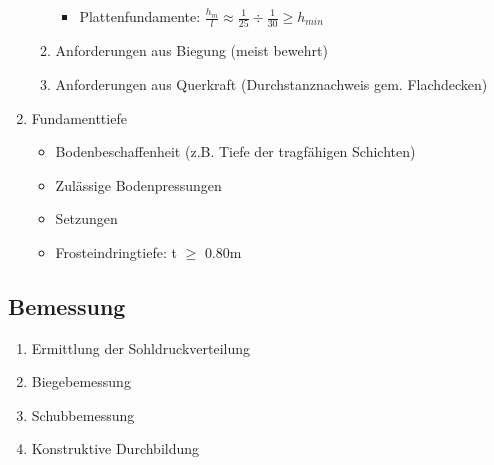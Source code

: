 \begin{multicols}{2}
\begin{enumerate}
\begin{enumerate}
\begin{itemize}
								\item Plattenfundamente: $ \frac{h_m}{l} \approx \frac{1}{25} \div \frac{1}{30} \geq h_{min}  $
								
							\end{itemize}
					
						\item Anforderungen aus Biegung (meist bewehrt)
					
						\item Anforderungen aus Querkraft (Durchstanznachweis gem. Flachdecken)
					
					\end{enumerate}
			
				\item Fundamenttiefe
					\begin{itemize}
						
						\item Bodenbeschaffenheit (z.B. Tiefe der tragfähigen Schichten)
						\item Zulässige Bodenpressungen
						\item Setzungen
						\item Frosteindringtiefe: t $\geq$ 0.80m
						
						
					\end{itemize}
				
			\end{enumerate}
		
		
%	
%
		
		\subsection{Bemessung}
			
			\begin{enumerate}
				
				\item Ermittlung der Sohldruckverteilung
				
				\item Biegebemessung
				
				\item Schubbemessung
				
				\item Konstruktive Durchbildung
				
			\end{enumerate}
		
		
		

\end{multicols}	

	\begin{minipage}{0.5\linewidth}
		
		
		
	\end{minipage}